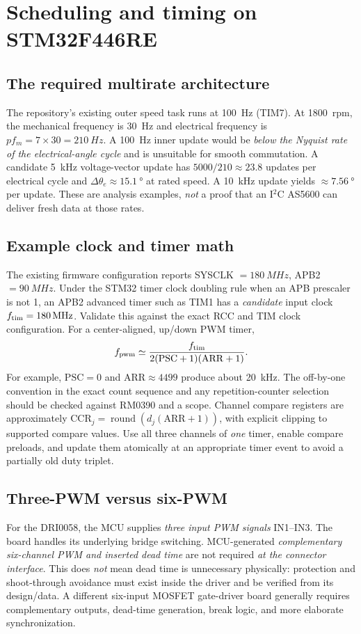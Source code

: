 \documentclass[10pt,letterpaper]{article}
\begin{document}
\section{Scheduling and timing on STM32F446RE}
\subsection{The required multirate architecture}
The repository's existing outer speed task runs at \SI{100}{Hz} (TIM7). At \SI{1800}{rpm}, the mechanical frequency is \SI{30}{Hz} and electrical frequency is $pf_m=7\times30=\SI{210}{Hz}$. A \SI{100}{Hz} inner update would be \emph{below the Nyquist rate of the electrical-angle cycle} and is unsuitable for smooth commutation. A candidate \SI{5}{kHz} voltage-vector update has $5000/210\approx23.8$ updates per electrical cycle and $\Delta\theta_e\approx\SI{15.1}{\degree}$ at rated speed. A \SI{10}{kHz} update yields $\approx\SI{7.56}{\degree}$ per update. These are analysis examples, \emph{not} a proof that an I$^2$C AS5600 can deliver fresh data at those rates.

\subsection{Example clock and timer math}
The existing firmware configuration reports SYSCLK $=\SI{180}{MHz}$, APB2 $=\SI{90}{MHz}$. Under the STM32 timer clock doubling rule when an APB prescaler is not 1, an APB2 advanced timer such as TIM1 has a \emph{candidate} input clock $f_{\rm tim}=\SI{180}{MHz}$. Validate this against the exact RCC and TIM clock configuration. For a center-aligned, up/down PWM timer,
\begin{equation}\label{eq:arr}
f_{\rm pwm}\simeq\frac{f_{\rm tim}}{2(\mathrm{PSC}+1)(\mathrm{ARR}+1)}.
\end{equation}
For example, $\mathrm{PSC}=0$ and $\mathrm{ARR}\approx4499$ produce about \SI{20}{kHz}. The off-by-one convention in the exact count sequence and any repetition-counter selection should be checked against RM0390 and a scope. Channel compare registers are approximately $\mathrm{CCR}_j=\operatorname{round}(d_j(\mathrm{ARR}+1))$, with explicit clipping to supported compare values. Use all three channels of \emph{one} timer, enable compare preloads, and update them atomically at an appropriate timer event to avoid a partially old duty triplet.

\subsection{Three-PWM versus six-PWM}
For the DRI0058, the MCU supplies \emph{three input PWM signals} IN1--IN3. The board handles its underlying bridge switching. MCU-generated \emph{complementary six-channel PWM and inserted dead time} are not required \emph{at the connector interface}. This does \emph{not} mean dead time is unnecessary physically: protection and shoot-through avoidance must exist inside the driver and be verified from its design/data. A different six-input MOSFET gate-driver board generally requires complementary outputs, dead-time generation, break logic, and more elaborate synchronization.
\end{document}
